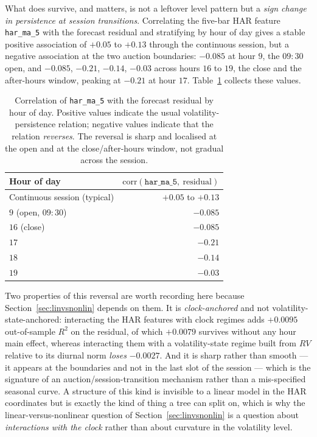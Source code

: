 What does survive, and matters, is not a leftover level pattern but a
\emph{sign change in persistence at session transitions}. Correlating the
five-bar HAR feature \texttt{har\_ma\_5} with the forecast residual and
stratifying by hour of day gives a stable positive association of $+0.05$ to
$+0.13$ through the continuous session, but a negative association at the two
auction boundaries: $-0.085$ at hour $9$, the $09{:}30$ open, and
$-0.085$, $-0.21$, $-0.14$, $-0.03$ across hours $16$ to $19$, the close and the
after-hours window, peaking at $-0.21$ at hour $17$.
Table~\ref{tab:desc_hourcorr} collects these values.

\begin{table}[H]
\centering
\caption{Correlation of \texttt{har\_ma\_5} with the forecast residual by hour of
day. Positive values indicate the usual volatility-persistence relation;
negative values indicate that the relation \emph{reverses}. The reversal is
sharp and localised at the open and at the close/after-hours window, not gradual
across the session.}
\label{tab:desc_hourcorr}
\begin{tabular}{lr}
\toprule
Hour of day & $\mathrm{corr}(\texttt{har\_ma\_5},\ \text{residual})$ \\
\midrule
Continuous session (typical) & $+0.05$ to $+0.13$ \\
$9$ (open, $09{:}30$)        & $-0.085$ \\
$16$ (close)                 & $-0.085$ \\
$17$                         & $-0.21$ \\
$18$                         & $-0.14$ \\
$19$                         & $-0.03$ \\
\bottomrule
\end{tabular}
\end{table}

Two properties of this reversal are worth recording here because
Section~\ref{sec:linvsnonlin} depends on them. It is \emph{clock-anchored} and
not volatility-state-anchored: interacting the HAR features with clock regimes
adds $+0.0095$ out-of-sample $R^2$ on the residual, of which $+0.0079$ survives
without any hour main effect, whereas interacting them with a
volatility-state regime built from $RV$ relative to its diurnal norm \emph{loses}
$-0.0027$.
And it is sharp rather than smooth --- it appears at the boundaries and not in
the last slot of the session --- which is the signature of an
auction/session-transition mechanism rather than a mis-specified seasonal curve.
A structure of this kind is invisible to a linear model in the HAR coordinates
but is exactly the kind of thing a tree can split on, which is why the
linear-versus-nonlinear question of Section~\ref{sec:linvsnonlin} is a question
about \emph{interactions with the clock} rather than about curvature in the
volatility level.

